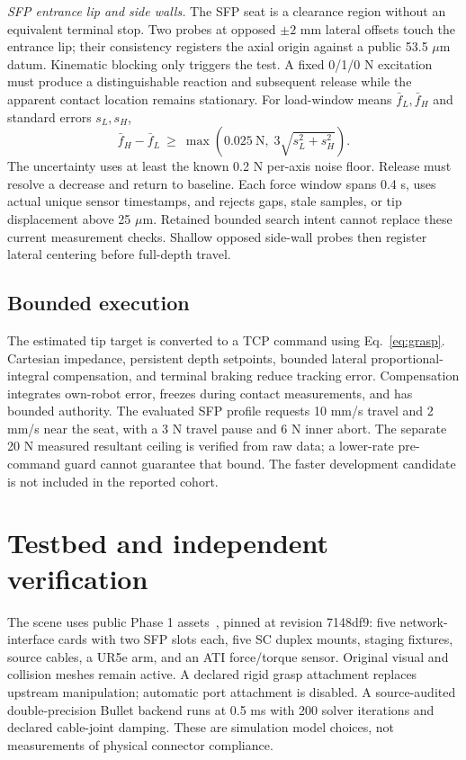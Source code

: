 \documentclass[letterpaper,10pt,conference]{ieeeconf}
\begin{document}
\textit{SFP entrance lip and side walls.} The SFP seat is a clearance region
without an equivalent terminal stop. Two probes at opposed $\pm2$ mm lateral
offsets touch the entrance lip; their consistency registers the axial origin
against a public 53.5 $\mu$m datum. Kinematic blocking only triggers the test.
A fixed 0/1/0 N excitation must produce a distinguishable reaction and
subsequent release while the apparent contact location remains stationary.
For load-window means $\bar f_L,\bar f_H$ and standard errors $s_L,s_H$,
\begin{equation}
 \bar f_H-\bar f_L\ \geq\
 \max\!\left(0.025\ \mathrm{N},\;3\sqrt{s_L^2+s_H^2}\right).
 \label{eq:contact}
\end{equation}
The uncertainty uses at least the known 0.2 N per-axis noise floor. Release
must resolve a decrease and return to baseline. Each force window spans
0.4 s, uses actual unique sensor timestamps, and rejects gaps, stale samples,
or tip displacement above 25 $\mu$m. Retained bounded search intent cannot
replace these current measurement checks. Shallow opposed side-wall probes
then register lateral centering before full-depth travel.

\subsection{Bounded execution}
The estimated tip target is converted to a TCP command using
Eq.~\ref{eq:grasp}. Cartesian impedance, persistent depth setpoints, bounded
lateral proportional-integral compensation, and terminal braking reduce
tracking error. Compensation integrates own-robot error, freezes during
contact measurements, and has bounded authority. The evaluated SFP profile
requests 10 mm/s travel and 2 mm/s near the seat, with a 3 N travel pause and
6 N inner abort. The separate 20 N measured resultant ceiling is verified
from raw data; a lower-rate pre-command guard cannot guarantee that bound.
The faster development candidate is not included in the reported cohort.

\section{Testbed and independent verification}
The scene uses public Phase 1 assets~\cite{aic}, pinned at revision 7148df9:
five network-interface cards with two SFP slots each, five SC duplex mounts,
staging fixtures, source cables, a UR5e arm, and an ATI force/torque sensor.
Original visual and collision meshes remain active. A declared rigid grasp
attachment replaces upstream manipulation; automatic port attachment is
disabled. A source-audited double-precision Bullet backend runs at 0.5 ms
with 200 solver iterations and declared cable-joint damping. These are
simulation model choices, not measurements of physical connector compliance.
\end{document}
